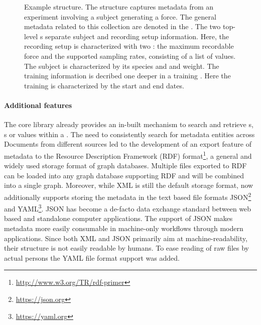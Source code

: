 \begin{figure}
 \centering
 \scalebox{0.45}{
 }
 \caption[Example  structure]{Example  structure. The  structure captures metadata from an experiment involving a subject generating a force. The general metadata related to this collection are denoted in the  . The two top-level s separate subject and recording setup information. Here, the recording setup is characterized with two : the maximum recordable force and the supported sampling rates, consisting of a list of values. The subject is characterized by its species and and weight. The training information is decribed one deeper in a training . Here the training is characterized by the start and end dates.}
 \label{fig:intro_example_odml_structure}
\end{figure}


\paragraph{Additional features}
The  core library already provides an in-built mechanism to search and retrieve s, s or values within a . The need to consistently search for metadata entities across Documents from different sources led to the development of an export feature of  metadata to the Resource Description Framework (RDF) format\footnote{\url{http://www.w3.org/TR/rdf-primer}}, a general and widely used storage format of graph databases. Multiple  files exported to RDF can be loaded into any graph database supporting RDF and will be combined into a single graph. Moreover, while XML is still the default storage format,  now additionally supports storing the metadata in the text based file formats JSON\footnote{\url{https://json.org}} and YAML\footnote{\url{https://yaml.org}}. JSON has become a de-facto data exchange standard between web based and standalone computer applications. The support of JSON makes  metadata more easily consumable in machine-only workflows through modern applications. Since both XML and JSON primarily aim at machine-readability, their structure is not easily readable by humans. To ease reading of raw  files by actual persons the YAML file format support was added.

